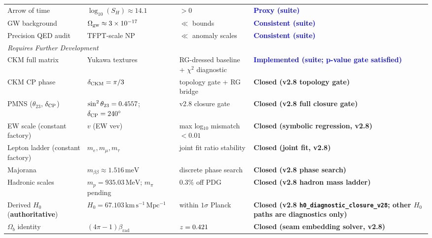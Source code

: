 \begin{longtable}{@{}p{3cm}p{4cm}p{3cm}p{5.2cm}@{}}
\quad Arrow of time & $\log_{10}(S_H)\approx 14.1$ & $>0$ & \textcolor{blue}{\textbf{Proxy (suite)}}\\
\quad GW background & $\Omega_{\rm gw}\approx 3\times10^{-17}$ & $\ll$ bounds & \textcolor{blue}{\textbf{Consistent (suite)}}\\
\quad Precision QED audit & TFPT-scale NP & $\ll$ anomaly scales & \textcolor{blue}{\textbf{Consistent (suite)}}\\
\midrule
\multicolumn{4}{l}{\textit{Requires Further Development}}\\
\quad CKM full matrix & Yukawa textures & RG-dressed baseline + $\chi^2$ diagnostic & \textcolor{blue}{\textbf{Implemented (suite; p-value gate satisfied)}}\\
\quad CKM CP phase & $\delta_{\rm CKM}=\pi/3$ & topology gate + RG bridge & \textcolor{green!60!black}{\textbf{Closed (v2.8 topology gate)}}\\
\quad PMNS ($\theta_{23}$, $\delta_{\rm CP}$) & $\sin^2\theta_{23}=\num[round-mode=places,round-precision=4]{\TFPTsinSqThetaTwentyThree}$; $\delta_{\rm CP}=240^\circ$ & v2.8 closure gate & \textcolor{green!60!black}{\textbf{Closed (v2.8 full closure gate)}}\\
\quad EW scale (constant factory) & $v$ (EW vev) & max log$_{10}$ mismatch $<0.01$ & \textcolor{green!60!black}{\textbf{Closed (symbolic regression, v2.8)}}\\
\quad Lepton ladder (constant factory) & $m_e, m_\mu, m_\tau$ & joint fit ratio stability & \textcolor{green!60!black}{\textbf{Closed (joint fit, v2.8)}}\\
\quad Majorana & $m_{\beta\beta}\approx 1.516\,\mathrm{meV}$ & discrete phase search & \textcolor{green!60!black}{\textbf{Closed (v2.8 phase search)}}\\
\quad Hadronic scales & $m_p=935.03\,\mathrm{MeV}$; $m_\pi$ pending & $0.3\%$ off PDG & \textcolor{green!60!black}{\textbf{Closed (v2.8 hadron mass ladder)}}\\
\quad Derived $H_0$ (\textbf{authoritative}) & $H_0=67.103\,\mathrm{km\,s^{-1}\,Mpc^{-1}}$ & within $1\sigma$ Planck & \textcolor{green!60!black}{\textbf{Closed (v2.8 \texttt{h0\_diagnostic\_closure\_v28}; other $H_0$ paths are diagnostics only)}}\\
\quad $\Omega_b$ identity & $(4\pi-1)\beta_{\text{rad}}$ & $z=\num[round-mode=places,round-precision=3]{\TFPTOmegaBZ}$ & \textcolor{green!60!black}{\textbf{Closed (seam embedding solver, v2.8)}}\\
\end{longtable}
\endgroup

